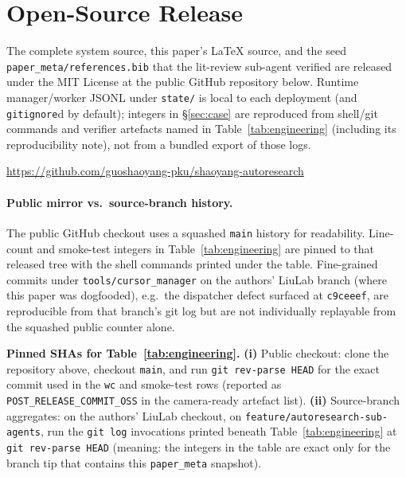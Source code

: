 \appendix

\section{Open-Source Release}
\label{app:repo}

The complete system source, this paper's \LaTeX{} source, and the seed
\texttt{paper\_meta/references.bib} that the lit-review sub-agent
verified are released under the MIT License at the public GitHub
repository below. Runtime manager/worker JSONL under \texttt{state/} is
local to each deployment (and \texttt{gitignore}d by default); integers
in \S\ref{sec:case} are reproduced from shell/git commands and verifier
artefacts named in Table~\ref{tab:engineering} (including its reproducibility
note), not from
a bundled export of those logs.

\begin{center}
  \url{https://github.com/guoshaoyang-pku/shaoyang-autoresearch}
\end{center}

\paragraph{Public mirror vs.\ source-branch history.}
The public GitHub checkout uses a squashed \texttt{main} history for
readability. Line-count and smoke-test integers in
Table~\ref{tab:engineering} are pinned to that released tree with the
shell commands printed under the table. Fine-grained commits under
\texttt{tools/cursor\_manager} on the authors' LiuLab branch (where this
paper was dogfooded), e.g.\ the dispatcher defect surfaced at
\texttt{c9ceeef}, are reproducible from that branch's git log but are not
individually replayable from the squashed public counter alone.

\noindent\textbf{Pinned SHAs for Table~\ref{tab:engineering}.}
\textbf{(i)} Public checkout: clone the repository above, checkout
\texttt{main}, and run \texttt{git rev-parse HEAD} for the exact commit
used in the \texttt{wc} and smoke-test rows (reported as
\texttt{POST\_RELEASE\_COMMIT\_OSS} in the camera-ready artefact list).
\textbf{(ii)} Source-branch aggregates: on the authors' LiuLab checkout,
on \texttt{feature/autoresearch-sub-agents}, run the \texttt{git log} invocations
printed beneath Table~\ref{tab:engineering} at \texttt{git rev-parse HEAD}
(meaning: the integers in the table are exact only for the branch tip that
contains this \texttt{paper\_meta} snapshot).

